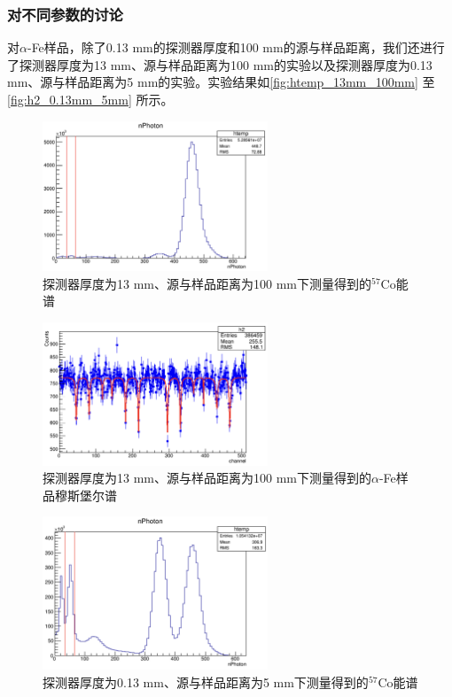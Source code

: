 \documentclass[font=default]{mpltx}
\begin{document}
\subsubsection{对不同参数的讨论}
对$\alpha$-Fe样品，除了0.13 mm的探测器厚度和100 mm的源与样品距离，我们还进行了探测器厚度为13 mm、源与样品距离为100 mm的实验以及探测器厚度为0.13 mm、源与样品距离为5 mm的实验。实验结果如\autoref{fig:htemp_13mm_100mm} 至\autoref{fig:h2_0.13mm_5mm} 所示。
\begin{figure}[h]
  \centering
  \includegraphics[width=0.6\textwidth]{fig/DetThick/13mm/htemp.png}
  \caption{探测器厚度为13 mm、源与样品距离为100 mm下测量得到的$^{57}$Co能谱}
  \label{fig:htemp_13mm_100mm}
\end{figure}
\begin{figure}[h]
  \centering
  \includegraphics[width=0.6\textwidth]{fig/DetThick/13mm/h2.png}
  \caption{探测器厚度为13 mm、源与样品距离为100 mm下测量得到的$\alpha$-Fe样品穆斯堡尔谱}
  \label{fig:h2_13mm_100mm}
\end{figure}
\begin{figure}[h]
  \centering
  \includegraphics[width=0.6\textwidth]{fig/DistSource/5mm/htemp.png}
  \caption{探测器厚度为0.13 mm、源与样品距离为5 mm下测量得到的$^{57}$Co能谱}
  \label{fig:htemp_0.13mm_5mm}
\end{figure}
\end{document}
